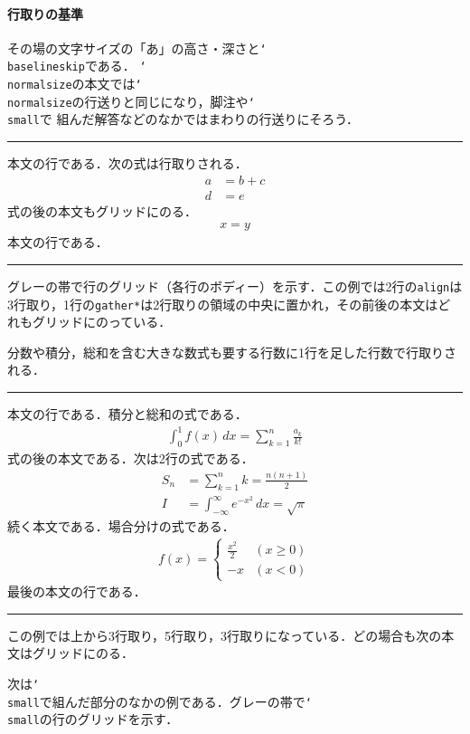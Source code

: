 \documentclass[paper=a4,dvipdfmx]{jlreq}
\newcommand\env[1]{\texttt{#1}}
\newcommand\cs[1]{\texttt{\char`\\#1}}
\newenvironment{demo}
  {\par\medskip\noindent
   \begin{minipage}{\linewidth}\hrule\smallskip}
  {\par\smallskip\hrule\end{minipage}\par\medskip}
\begin{document}
\paragraph{行取りの基準}

その場の文字サイズの「あ」の高さ・深さと\cs{baselineskip}である．
\cs{normalsize}の本文では\cs{normalsize}の行送りと同じになり，脚注や\cs{small}で
組んだ解答などのなかではまわりの行送りにそろう．

\begin{demo}
本文の行である．次の式は行取りされる．
\begin{align}
  a &= b + c \\
  d &= e
\end{align}
式の後の本文もグリッドにのる．
\begin{gather*}
  x = y
\end{gather*}
本文の行である．
\end{demo}

グレーの帯で行のグリッド（各行のボディー）を示す．この例では2行の\env{align}は3行取り，1行の\env{gather*}は2行取りの領域の中央に置かれ，その前後の本文はどれもグリッドにのっている．

分数や積分，総和を含む大きな数式も要する行数に1行を足した行数で行取りされる．

\begin{demo}
本文の行である．積分と総和の式である．
\begin{gather}
  \int_0^1 f(x)\,dx = \sum_{k=1}^{n} \frac{a_k}{k!}
\end{gather}
式の後の本文である．次は2行の式である．
\begin{align}
  S_n &= \sum_{k=1}^{n} k = \frac{n(n+1)}{2} \\
  I &= \int_{-\infty}^{\infty} e^{-x^2}\,dx = \sqrt{\pi}
\end{align}
続く本文である．場合分けの式である．
\begin{gather}
  f(x) =
  \begin{cases}
    \frac{x^2}{2} & (x \ge 0) \\
    -x & (x < 0)
  \end{cases}
\end{gather}
最後の本文の行である．
\end{demo}

この例では上から3行取り，5行取り，3行取りになっている．どの場合も次の本文はグリッドにのる．

次は\cs{small}で組んだ部分のなかの例である．グレーの帯で\cs{small}の行のグリッドを示す．
\end{document}

